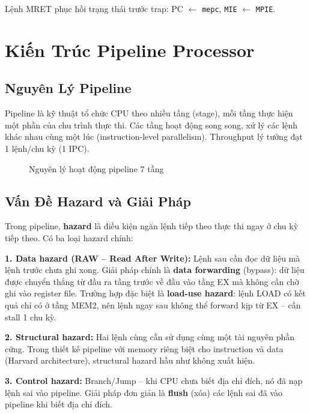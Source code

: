 Lệnh MRET phục hồi trạng thái trước trap: PC $\leftarrow$ \texttt{mepc}, \texttt{MIE} $\leftarrow$ \texttt{MPIE}.

\section{Kiến Trúc Pipeline Processor}

\subsection{Nguyên Lý Pipeline}

Pipeline là kỹ thuật tổ chức CPU theo nhiều tầng (stage), mỗi tầng thực hiện một phần của chu trình thực thi. Các tầng hoạt động song song, xử lý các lệnh khác nhau cùng một lúc (instruction-level parallelism). Throughput lý tưởng đạt 1 lệnh/chu kỳ (1 IPC).

\begin{figure}[htp]
\centering
{}
\caption{Nguyên lý hoạt động pipeline 7 tầng}
\label{fig:pipeline-timing}
\end{figure}

\subsection{Vấn Đề Hazard và Giải Pháp}

Trong pipeline, \textbf{hazard} là điều kiện ngăn lệnh tiếp theo thực thi ngay ở chu kỳ tiếp theo. Có ba loại hazard chính:

\textbf{1. Data hazard (RAW -- Read After Write):} Lệnh sau cần đọc dữ liệu mà lệnh trước chưa ghi xong. Giải pháp chính là \textbf{data forwarding} (bypass): dữ liệu được chuyển thẳng từ đầu ra tầng trước về đầu vào tầng EX mà không cần chờ ghi vào register file. Trường hợp đặc biệt là \textbf{load-use hazard}: lệnh LOAD có kết quả chỉ có ở tầng MEM2, nên lệnh ngay sau không thể forward kịp từ EX -- cần stall 1 chu kỳ.

\textbf{2. Structural hazard:} Hai lệnh cùng cần sử dụng cùng một tài nguyên phần cứng. Trong thiết kế pipeline với memory riêng biệt cho instruction và data (Harvard architecture), structural hazard hầu như không xuất hiện.

\textbf{3. Control hazard:} Branch/Jump -- khi CPU chưa biết địa chỉ đích, nó đã nạp lệnh sai vào pipeline. Giải pháp đơn giản là \textbf{flush} (xóa) các lệnh sai đã vào pipeline khi biết địa chỉ đích.

